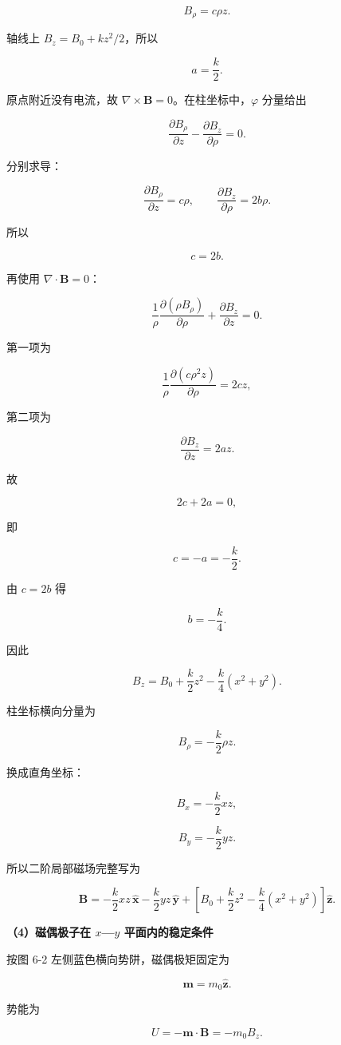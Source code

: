\documentclass[12pt,a4paper,UTF8]{ctexart}
\begin{document}
\[
B_\rho=c\rho z.
\]

轴线上 \(B_z=B_0+kz^2/2\)，所以

\[a=\frac k2.\]

原点附近没有电流，故 \(\nabla\times\bm B=0\)。在柱坐标中，\(\varphi\)
分量给出

\[
\frac{\partial B_\rho}{\partial z}
-\frac{\partial B_z}{\partial\rho}=0.
\]

分别求导：

\[
\frac{\partial B_\rho}{\partial z}=c\rho,
\qquad
\frac{\partial B_z}{\partial\rho}=2b\rho.
\]

所以

\[c=2b.\]

再使用 \(\nabla\cdot\bm B=0\)：

\[
\frac1\rho\frac{\partial(\rho B_\rho)}{\partial\rho}
+\frac{\partial B_z}{\partial z}=0.
\]

第一项为

\[
\frac1\rho\frac{\partial(c\rho^2z)}{\partial\rho}
=2cz,
\]

第二项为

\[\frac{\partial B_z}{\partial z}=2az.\]

故

\[2c+2a=0,\]

即

\[c=-a=-\frac k2.\]

由 \(c=2b\) 得

\[b=-\frac k4.\]

因此

\[
\boxed{
B_z=B_0+\frac k2z^2-
\frac k4(x^2+y^2)
}.
\]

柱坐标横向分量为

\[
B_\rho=-\frac k2\rho z.
\]

换成直角坐标：

\[
\boxed{B_x=-\frac k2xz},
\]

\[
\boxed{B_y=-\frac k2yz}.
\]

所以二阶局部磁场完整写为

\[
\boxed{
\bm B=
-\frac k2xz\,\hat{\bm x}
-\frac k2yz\,\hat{\bm y}
+\left[
B_0+\frac k2z^2-\frac k4(x^2+y^2)
\right]\hat{\bm z}
}.
\]

\textbf{（4）磁偶极子在 \(x\)---\(y\) 平面内的稳定条件}

按图 6-2 左侧蓝色横向势阱，磁偶极矩固定为

\[\bm m=m_0\hat{\bm z}.\]

势能为

\[U=-\bm m\cdot\bm B=-m_0B_z.\]
\end{document}

